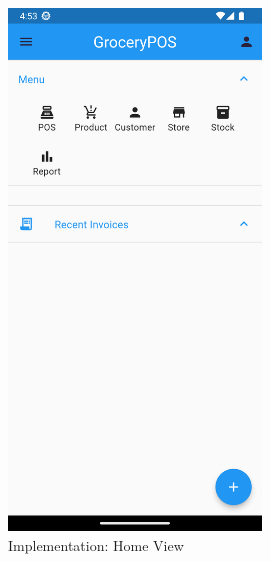 \documentclass[../thesis.tex]{subfiles}
\begin{document}
\begin{figure}[H]
    \centering
    \includegraphics[width=0.60\textwidth]{images/HomeScreen.png}
    \caption{Implementation: Home View}
    \label{fig:HomeScreen}
\end{figure}
\end{document}
